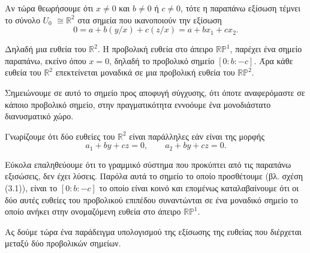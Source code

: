 \documentclass[12pt, a4paper]{book}
\begin{document}
Αν τώρα θεωρήσουμε ότι $x \neq 0$ και $b \neq 0$ ή $c \neq 0$, τότε η παραπάνω εξίσωση τέμνει το σύνολο $U_0$ $\cong\mathbb{R}^2$ στα σημεία που ικανοποιούν την εξίσωση
\begin{displaymath}
0=a+b(y/x)+c(z/x)= a + bx_1+cx_2.
\end{displaymath}

Δηλαδή μια ευθεία του $\mathbb{R}^2$. Η προβολική ευθεία στο άπειρο $\mathbb{R}\mathbb{P}^1$, παρέχει ένα σημείο παραπάνω, εκείνο όπου $x = 0$, δηλαδή το προβολικό σημείο $[0:b:-c]$. Άρα κάθε ευθεία του $\mathbb{R}^2$ επεκτείνεται μοναδικά σε μια προβολική ευθεία του $\mathbb{R}\mathbb{P}^2$.

Σημειώνουμε σε αυτό το σημείο προς αποφυγή σύγχυσης, ότι όποτε αναφερόμαστε σε κάποιο προβολικό σημείο, στην πραγματικότητα εννοόυμε ένα μονοδιάστατο διανυσματικό χώρο.

Γνωρίζουμε ότι δύο ευθείες του $\mathbb{R}^2$ είναι παράλληλες εάν είναι της μορφής
\begin{displaymath}
a_1 + by+cz =0, \qquad  a_2+by+cz =0.
\end{displaymath}

Εύκολα επαληθεύουμε ότι το γραμμικό σύστημα που προκύπτει από τις παραπάνω εξισώσεις, δεν έχει λύσεις. Παρόλα αυτά το σημείο το οποίο προσθέτουμε (βλ. σχέση (3.1)), είναι το $[0:b:-c]$ το οποίο είναι κοινό και επομένως καταλαβαίνουμε ότι οι δύο αυτές ευθείες του προβολικού επιπέδου συναντώνται σε ένα μοναδικό σημείο το οποίο ανήκει στην ονομαζόμενη ευθεία στο άπειρο $\mathbb{R}\mathbb{P}^1$.

Ας δούμε τώρα ένα παράδειγμα υπολογισμού της εξίσωσης της ευθείας που διέρχεται μεταξύ δύο προβολικών σημείων.
\end{document}
